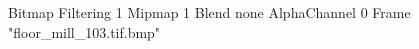 {Bitmap
	{Filtering 1}
	{Mipmap 1}
	{Blend none}
	{AlphaChannel 0}
	{Frame "floor_mill_103.tif.bmp"}
}
